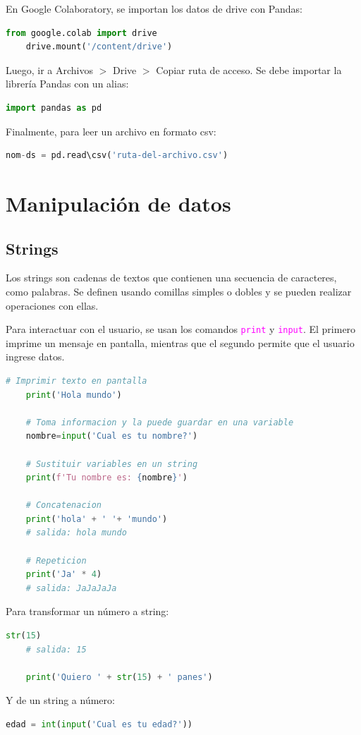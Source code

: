 \documentclass[a4paper, 12pt]{book}
\begin{document}
En Google Colaboratory, se importan los datos de drive con Pandas:
\begin{lstlisting}[language=Python]
	from google.colab import drive
	drive.mount('/content/drive')
\end{lstlisting}
Luego, ir a Archivos $>$ Drive $>$ Copiar ruta de acceso. Se debe importar la librería Pandas con un alias:
\begin{lstlisting}[language=Python]
	import pandas as pd
\end{lstlisting}
Finalmente, para leer un archivo en formato csv:
\begin{lstlisting}[language=Python]
	nom-ds = pd.read\csv('ruta-del-archivo.csv')
\end{lstlisting}

\section{Manipulación de datos}
\subsection{Strings}
Los strings son cadenas de textos que contienen una secuencia de caracteres, como palabras. Se definen usando comillas simples o dobles y se pueden realizar operaciones con ellas.

Para interactuar con el usuario, se usan los comandos \texttt{\textcolor{magenta}{print}} y \texttt{\textcolor{magenta}{input}}. El primero imprime un mensaje en pantalla, mientras que el segundo permite que el usuario ingrese datos.
\begin{lstlisting}[language=Python]
	# Imprimir texto en pantalla
	print('Hola mundo')
	
	# Toma informacion y la puede guardar en una variable
	nombre=input('Cual es tu nombre?')
	
	# Sustituir variables en un string
	print(f'Tu nombre es: {nombre}')
	
	# Concatenacion
	print('hola' + ' '+ 'mundo')
	# salida: hola mundo
	
	# Repeticion
	print('Ja' * 4)
	# salida: JaJaJaJa
\end{lstlisting}


Para transformar un número a string:
\begin{lstlisting}[language=Python]
	str(15)
	# salida: 15
	
	print('Quiero ' + str(15) + ' panes')
\end{lstlisting}
Y de un string a número:
\begin{lstlisting}[language=Python]
	edad = int(input('Cual es tu edad?'))
\end{lstlisting}
\end{document}
